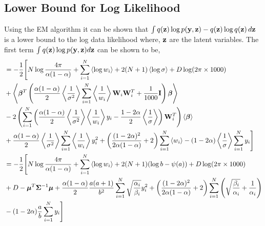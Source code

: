 \begin{appendices}
\subsection{Lower Bound for Log Likelihood}
\label{sec:l_bound}
Using the EM algorithm it can be shown that $\int q(\mathbf{z})\log p(\mathbf{y},\mathbf{z})-q(\mathbf{z})\log q(\mathbf{z})\,d\mathbf{z}$ is a lower bound to the log data likelihood where, $\mathbf{z}$ are the latent variables. The first term $\int q(\mathbf{z})\log p(\mathbf{y},\mathbf{z})d\mathbf{z}$ can be shown to be,
\begin{align}
\nonumber
&=-\frac{1}{2}\Biggl[N\log\frac{4\pi}{\alpha(1-\alpha)}+\sum_{i=1}^{N}\left\langle\log w_i\right\rangle +2(N+1)\left\langle\log\sigma\right\rangle+D\log (2\pi\times1000)\\
\nonumber&+\left\langle\bm{\beta}^T\left(\frac{\alpha(1-\alpha)}{2}\left\langle\frac{1}{\sigma^2}\right\rangle\sum_{i=1}^{N}\left\langle\frac{1}{w_i}\right\rangle\mathbf{W}_i\mathbf{W}_i^T+\frac{1}{1000}\mathbf{I}\right)\bm{\beta}\right\rangle\\
\nonumber
&-2\left(\sum_{i=1}^{N}\left(\frac{\alpha(1-\alpha)}{2}\left\langle\frac{1}{\sigma^2}\right\rangle\left\langle\frac{1}{w_i}\right\rangle y_i-\frac{1-2\alpha}{2}\left\langle\frac{1}{\sigma}\right\rangle\right)\mathbf{W}_i^T\right)\left\langle\bm{\beta}\right\rangle\\
\nonumber
&+\frac{\alpha(1-\alpha)}{2}\left\langle\frac{1}{\sigma^2}\right\rangle\sum_{i=1}^{N}\left\langle\frac{1}{w_i}\right\rangle y_i^2+\left(\frac{(1-2\alpha)^2}{2\alpha(1-\alpha)}+2\right)\sum_{i=1}^{N}\left\langle w_i\right\rangle-(1-2\alpha)\left\langle\frac{1}{\sigma}\right\rangle\sum_{i=1}^{N} y_i\Biggr]\\
\nonumber&=-\frac{1}{2}\Biggl[N\log\frac{4\pi}{\alpha(1-\alpha)}+\sum_{i=1}^{N}\left\langle\log w_i\right\rangle +2(N+1)(\log b -\psi(a))+D\log (2\pi\times1000)\\
\nonumber&+D-{\boldsymbol{\mu}}^T{\mathbf{\Sigma}}^{-1}{\boldsymbol{\mu}}+\frac{\alpha(1-\alpha)}{2}\frac{a(a+1)}{b^2}\sum_{i=1}^{N}\sqrt{\frac{\alpha_i}{\beta_i}}y_i^2+\left(\frac{(1-2\alpha)^2}{2\alpha(1-\alpha)}+2\right)\sum_{i=1}^{N}\left(\sqrt{\frac{\beta_i}{\alpha_i}}+\frac{1}{\alpha_i}\right)\\
&-(1-2\alpha)\frac{a}{b}\sum_{i=1}^{N} y_i\Biggr]
\end{align}


\end{appendices}
